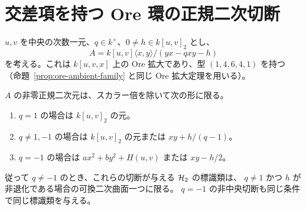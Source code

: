 \section{交差項を持つ Ore 環の正規二次切断}
\label{sec:ore-normal-quadrics}

$u,v$ を中央の次数一元、$q\in k^\times$、$0\ne h\in k[u,v]_2$ とし、
\[
 A=k[u,v]\langle x,y\rangle/(yx-qxy-h)
\]
を考える。これは $k[u,v,x]$ 上の Ore 拡大であり、型 $(1,4,6,4,1)$ を持つ
（命題~\ref{prop:ore-ambient-family} と同じ Ore 拡大定理を用いる）。

\begin{proposition}
\label{prop:ore-normal-quadrics}
$A$ の非零正規二次元は、スカラー倍を除いて次の形に限る。
\begin{enumerate}
\item $q=1$ の場合は $k[u,v]_2$ の元。
\item $q\ne 1,-1$ の場合は $k[u,v]_2$ の元または $xy+h/(q-1)$。
\item $q=-1$ の場合は $a x^2+b y^2+H(u,v)$ または $xy-h/2$。
\end{enumerate}
従って $q\ne-1$ のとき、これらの切断が与える $\mathcal H_2$ の標識類は、
$q\ne1$ かつ $h$ が非退化である場合の可換二次曲面一つに限る。
$q=-1$ の非中央切断も同じ条件で同じ標識類を与える。
\end{proposition}

